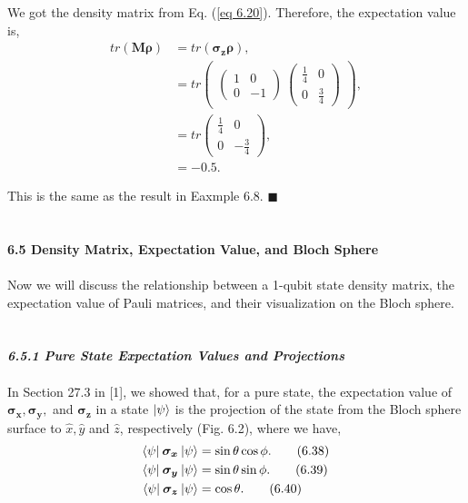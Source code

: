 \documentclass{article}
\newcommand{\bfit}[1]{\textit{\textbf{#1}}}
\begin{document}
We got the density matrix from Eq. (\ref{eq 6.20}). Therefore, the expectation value is,
\begin{align*} \label{eq 6.37}
    tr(\boldsymbol{M}\boldsymbol{\rho})&=tr(\boldsymbol{\sigma_z}\boldsymbol{\rho}),\\
    &=tr\begin{pmatrix}
        \begin{pmatrix}
            1&0\\0&-1
        \end{pmatrix} \
        \begin{pmatrix}
            \frac{1}{4} &0\\0&\frac{3}{4}
        \end{pmatrix}
    \end{pmatrix},\\
    &=tr\begin{pmatrix}
        \frac{1}{4} &0\\0&-\frac{3}{4}
    \end{pmatrix},\\
    &=-0.5. \tag{6.37}
\end{align*}

This is the same as the result in Eaxmple 6.8. \hfill $\blacksquare$\\\\\\
\textbf{\large 6.5 Density Matrix, Expectation Value, and Bloch Sphere}\\\\
Now we will discuss the relationship between a 1-qubit state density matrix, the expectation
value of Pauli matrices, and their visualization on the Bloch sphere.\\\\\\
\bfit{\large 6.5.1 Pure State Expectation Values and Projections}\\\\
In Section 27.3 in [1], we showed that, for a pure state, the expectation value of $\boldsymbol{\sigma_x}, \boldsymbol{\sigma_y}
,$ and $\boldsymbol{\sigma_z}$ in a state $\ket{\psi}$ is the projection of the state from the Bloch sphere surface
to $\hat{x},\hat{y}$ and $\hat{z}$, respectively (Fig. 6.2), where we have,
\begin{align*}\label{eq 6.38}
    \braket{\psi|\: \boldsymbol{\sigma_x} \:|\psi}&=\sin{\theta}\cos{\phi}.\tag{6.38}\\
    \braket{\psi|\: \boldsymbol{\sigma_y} \:|\psi}&=\sin{\theta}\sin{\phi}.\tag{6.39}\\
    \braket{\psi|\: \boldsymbol{\sigma_z} \:|\psi}&=\cos{\theta}.\tag{6.40}
\end{align*}
\end{document}
